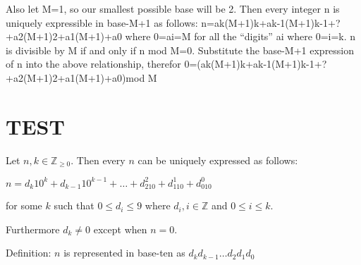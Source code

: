 \documentclass{article}
\newenvironment{jprIn}{\begin{adjustwidth}{2em}{}}{\end{adjustwidth}}
\begin{document}
Also let M=1, so our smallest possible base will be 2.
Then every integer n is uniquely expressible in base-M+1 as follows:
n=ak(M+1)k+ak-1(M+1)k-1+?+a2(M+1)2+a1(M+1)+a0
where 0=ai=M for all the ``digits'' ai where 0=i=k.
n is divisible by M if and only if n mod M=0. 
Substitute the base-M+1 expression of n into the above relationship, therefor
0=(ak(M+1)k+ak-1(M+1)k-1+?+a2(M+1)2+a1(M+1)+a0)mod M


\section*{TEST}

\begin{jprIn}
Let $n,k\in \mathbb{Z}_{\ge 0}$. Then every $n$ can be uniquely expressed as follows:

\hspace{3em}$n=d_k10^k+d_{k-1}10^{k-1}+\dots+d_210^2+d_110^1+d_010^0$

for some $k$ such that $0 \le d_i \le 9$ where $d_i,i\in\mathbb{Z}$ and $0 \le i \le k$.

Furthermore $d_k\ne0$ except when $n=0$.

Definition: $n$ is represented in base-ten as $d_kd_{k-1}\dots{}d_2d_1d_0$
\end{jprIn}
\bigskip
\end{document}
